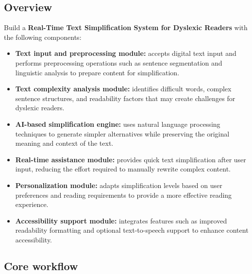 \documentclass[11pt,a4paper]{article}
\begin{document}
\subsection{Overview}

Build a \textbf{Real-Time Text Simplification System for Dyslexic Readers} with the following components:

\begin{itemize}[leftmargin=0.7cm]

    \item \textbf{Text input and preprocessing module:} accepts digital text input and performs preprocessing operations such as sentence segmentation and linguistic analysis to prepare content for simplification.

    \item \textbf{Text complexity analysis module:} identifies difficult words, complex sentence structures, and readability factors that may create challenges for dyslexic readers.

    \item \textbf{AI-based simplification engine:} uses natural language processing techniques to generate simpler alternatives while preserving the original meaning and context of the text.

    \item \textbf{Real-time assistance module:} provides quick text simplification after user input, reducing the effort required to manually rewrite complex content.

    \item \textbf{Personalization module:} adapts simplification levels based on user preferences and reading requirements to provide a more effective reading experience.

    \item \textbf{Accessibility support module:} integrates features such as improved readability formatting and optional text-to-speech support to enhance content accessibility.

\end{itemize}

\subsection{Core workflow}
\end{document}
